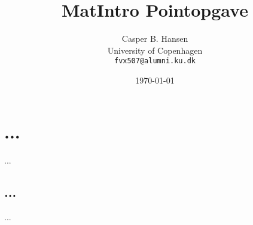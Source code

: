 \documentclass[11pt,a4paper]{article}
\title{MatIntro Pointopgave \assignmentnumber}
\author
{
    Casper B. Hansen\\
    University of Copenhagen\\
    {\tt fvx507@alumni.ku.dk}
}
\date{\today}
\begin{document}


\section
{
    \mdseries
    ...
}
...

\subsection
{
    \mdseries
    ...
}
...
\end{document}
